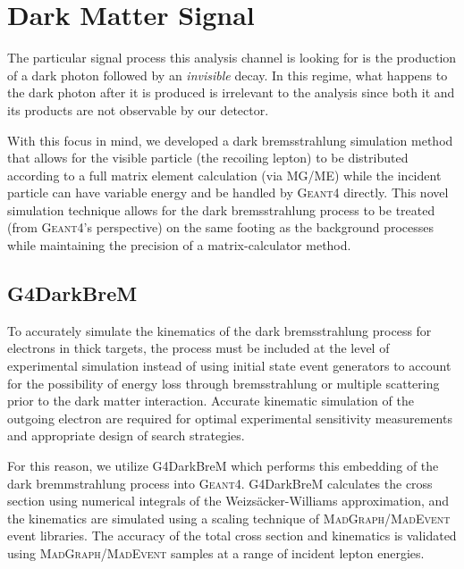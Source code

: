 \section{Dark Matter Signal}
The particular signal process this analysis channel is looking for is the production of a dark
photon followed by an \emph{invisible} decay. In this regime, what happens to the dark photon after
it is produced is irrelevant to the analysis since both it and its products are not observable by
our detector.

With this focus in mind, we developed a dark bremsstrahlung simulation method that allows for the
visible particle (the recoiling lepton) to be distributed according to a full matrix element
calculation (via MG/ME) while the incident particle can have variable energy and be handled by
\textsc{Geant4} directly.
This novel simulation technique allows for the dark bremsstrahlung process to be treated
(from \textsc{Geant4}'s perspective) on the same footing as the background processes while maintaining the
precision of a matrix-calculator method.

\subsection{G4DarkBreM}
To accurately simulate the kinematics of the dark bremsstrahlung process for electrons in thick
targets, the process must be included at the level of experimental simulation instead of using
initial state event generators to account for the possibility of energy loss through bremsstrahlung
or multiple scattering prior to the dark matter interaction. Accurate kinematic simulation of the
outgoing electron are required for optimal experimental sensitivity measurements and appropriate
design of search strategies.

For this reason, we utilize G4DarkBreM \cite{g4darkbrem} which performs this embedding of the dark
bremmstrahlung process into \textsc{Geant}4. G4DarkBreM calculates the cross section using
numerical integrals of the Weizs\"{a}cker-Williams approximation, and the kinematics are simulated
using a scaling technique of \textsc{MadGraph/MadEvent} event libraries. The accuracy of the total
cross section and kinematics is validated using \textsc{MadGraph/MadEvent} samples at a range of
incident lepton energies.

